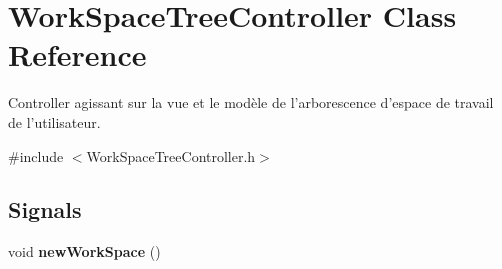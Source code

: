 \hypertarget{class_work_space_tree_controller}{
\section{WorkSpaceTreeController Class Reference}
\label{class_work_space_tree_controller}
}


Controller agissant sur la vue et le modèle de l'arborescence d'espace de travail de l'utilisateur.  




{\ttfamily \#include $<$WorkSpaceTreeController.h$>$}

\subsection*{Signals}
\begin{DoxyCompactItemize}
\item 
\hypertarget{class_work_space_tree_controller_ac9e9e637b0c9df77dfd289c25188f79a}{
void {\bfseries newWorkSpace} ()}
\label{class_work_space_tree_controller_ac9e9e637b0c9df77dfd289c25188f79a}

\end{DoxyCompactItemize}
